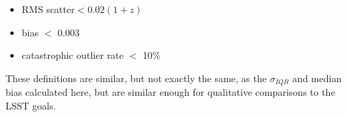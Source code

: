 \documentclass[usenatbib]{mn2e}
\newcommand{\red}[1]{\textcolor{red}{#1}}
\newcommand{\scc}[1]{\textcolor{scc}{#1}}%
\begin{document}
\begin{itemize}
\item RMS scatter$ < 0.02(1+z)$ 
\item bias $<$ 0.003 %
\item catastrophic outlier rate $<$ 10\% %
\end{itemize}
These definitions are similar, but not exactly the same, as the $\sigma_{IQR}$ and median bias calculated here, but are similar enough for qualitative comparisons to the LSST goals.

\end{document}

